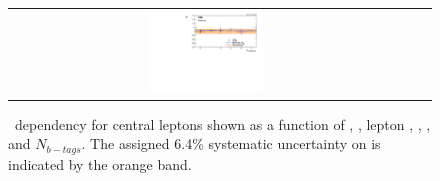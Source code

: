 \begin{figure}[htb]
\begin{center}
\begin{tabular}{ccc}
      \includegraphics[width=0.30\textwidth]{bkgd/figs/Triggereff_SFvsOF_Syst_PFHT_HighHTExclusiveCentral_Run2015_25ns_NBJets_None_NonIso_MC.pdf} \\
    \end{tabular}
    \caption{
      \label{fig:EffDependencyBarrel}
      \rt\ dependency for central leptons shown as a function of \nj, \nvtx, lepton \pt, \mll, \MET, and $N_{b-tags}$.
      The assigned 6.4\% systematic uncertainty on \rt is indicated by the orange band.
    }
  \end{center}
\end{figure}


